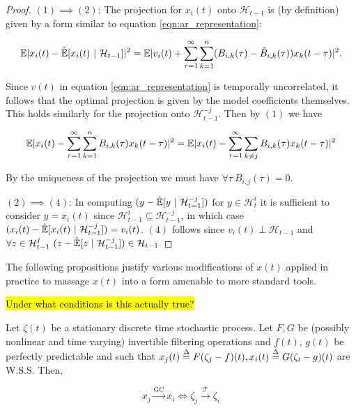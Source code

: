 \documentclass[12pt]{article}
\def\gc{\overset{\text{GC}}{\rightarrow}}  %
\def\te{\overset{\mathcal{T}}{\rightarrow}}  %
\newcommand{\linE}[2]{\hat{\E}[#1\ |\ #2]}  %
\begin{document}
\begin{proof}
$(1) \implies (2)$: The projection for $x_i(t)$ onto $\mathcal{H}_{t - 1}$ is (by definition) given by a form similar to equation \ref{eqn:ar_representation}: 

\[
  \E|x_i(t) - \linE{x_i(t)}{\mathcal{H}_{t - 1}}|^2 = \E|v_i(t) + \sum_{\tau = 1}^\infty \sum_{k = 1}^n (B_{i, k}(\tau) - \hat{B}_{i, k}(\tau))x_k(t - \tau)|^2.
\]

 Since $v(t)$ in equation \ref{eqn:ar_representation} is temporally uncorrelated, it follows that the optimal projection is given by the model coefficients themselves.  This holds similarly for the projection onto $\mathcal{H}_{t - 1}^{-j}$.  Then by $(1)$ we have

\[
  \mathbb{E}|x_i(t) - \sum_{\tau = 1}^\infty \sum_{k = 1}^n B_{i, k}(\tau)x_k(t - \tau)|^2 = \mathbb{E}|x_i(t) - \sum_{\tau = 1}^\infty\sum_{k \ne j}B_{i, k}(\tau)x_k(t - \tau)|^2
\]

By the uniqueness of the projection we must have $\forall \tau\  B_{i, j}(\tau) = 0$.

$(2) \implies (4)$: In computing $(y - \linE{y}{\mathcal{H}_{t = 1}^{-j}})$ for $y \in \mathcal{H}_t^i$ it is sufficient to consider $y = x_i(t)$ since $\mathcal{H}_{t - 1}^i \subseteq \mathcal{H}_{t - 1}^{-j}$, in which case $(x_i(t) - \linE{x_i(t)}{\mathcal{H}_{t = 1}^{-j}}) = v_i(t)$.  $(4)$ follows since $v_i(t) \perp \mathcal{H}_{t - 1}$ and $\forall z \in \mathcal{H}_{t - 1}^j\ (z - \linE{z}{\mathcal{H}_{t - 1}^{-j}}) \in \mathcal{H}_{t - 1}$
  
\end{proof}

The following propositions justify various modifications of $x(t)$
applied in practice to massage $x(t)$ into a form amenable to more
standard tools.

\begin{theorem}
  \hl{Under what conditions is this actually true?}

  Let $\zeta(t)$ be a stationary discrete time stochastic process.  Let
  $F, G$ be (possibly nonlinear and time varying) invertible filtering
  operations and $f(t)$, $g(t)$ be perfectly predictable and such that
  $x_j(t) \overset{\Delta}{=} F(\zeta_j - f)(t), x_i(t) \overset{\Delta}{=} G(\zeta_i - g)(t)$ are W.S.S.  Then,

\begin{equation}
    x_j \gc x_i \iff \zeta_j \te \zeta_i
  \end{equation}
\end{theorem}
\end{document}

